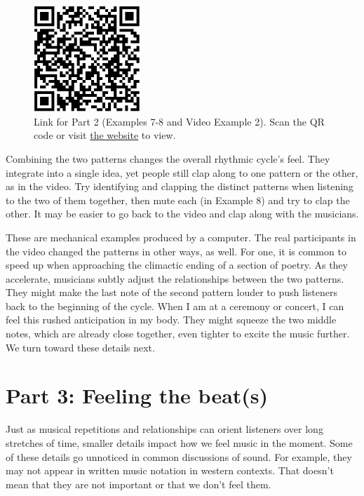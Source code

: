 \documentclass[twoside]{article}
\providecommand{\wmturlcaption}{
  Scan the QR code or visit \href{https://worldmusictextbook.org/witulski-rhythm}{the website} to view.
}
\begin{document}
\begin{figure}
  \centering
  \includegraphics[height=4cm]{witulski-rhythm-part-1.png}
  \caption*{Link for Part 2 (Examples 7-8 and Video Example 2). \wmturlcaption}
\end{figure}

Combining the two patterns changes the overall rhythmic cycle's feel.
They integrate into a single idea, yet people still clap along to one
pattern or the other, as in the video. Try identifying and clapping the
distinct patterns when listening to the two of them together, then mute
each (in Example 8) and try to clap the other. It may be easier to go back to the video
and clap along with the musicians.

These are mechanical examples produced by a computer. The real
participants in the video changed the patterns in other ways, as well.
For one, it is common to speed up when approaching the climactic ending
of a section of poetry. As they accelerate, musicians subtly adjust the
relationships between the two patterns. They might make the last note of
the second pattern louder to push listeners back to the beginning of the
cycle. When I am at a ceremony or concert, I can feel this rushed
anticipation in my body. They might squeeze the two middle notes, which
are already close together, even tighter to excite the music further. We
turn toward these details next.

\hypertarget{part-3-feeling-the-beats}{%
\section*{Part 3: Feeling the
beat(s)}\label{part-3-feeling-the-beats}}

Just as musical repetitions and relationships can orient listeners over
long stretches of time, smaller details impact how we feel music in the
moment. Some of these details go unnoticed in common discussions of
sound. For example, they may not appear in written music notation in
western contexts. That doesn't mean that they are not important or that
we don't feel them.
\end{document}
